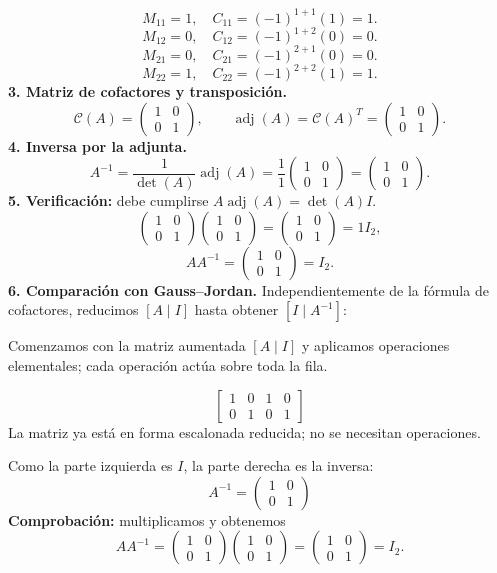 \documentclass[12pt]{article}
\theoremstyle{remark}
\newcommand{\adj}{\operatorname{adj}}
\begin{document}
\[
M_{11}=1,\quad C_{11}=(-1)^{1+1}(1)=1.
\]
\[
M_{12}=0,\quad C_{12}=(-1)^{1+2}(0)=0.
\]
\[
M_{21}=0,\quad C_{21}=(-1)^{2+1}(0)=0.
\]
\[
M_{22}=1,\quad C_{22}=(-1)^{2+2}(1)=1.
\]
\textbf{3. Matriz de cofactores y transposición.}
\[
\mathcal{C}(A)=\begin{pmatrix}1&0\\0&1\end{pmatrix},\qquad\adj(A)=\mathcal{C}(A)^T=\begin{pmatrix}1&0\\0&1\end{pmatrix}.
\]
\textbf{4. Inversa por la adjunta.}
\[
A^{-1}=\frac1{\det(A)}\adj(A)=\frac1{1}\begin{pmatrix}1&0\\0&1\end{pmatrix}=\begin{pmatrix}1&0\\0&1\end{pmatrix}.
\]
\textbf{5. Verificación:} debe cumplirse $A\adj(A)=\det(A)I$.
\[
\begin{pmatrix}1&0\\0&1\end{pmatrix}\begin{pmatrix}1&0\\0&1\end{pmatrix}=\begin{pmatrix}1&0\\0&1\end{pmatrix}=1I_{2},
\]
\[
AA^{-1}=\begin{pmatrix}1&0\\0&1\end{pmatrix}=I_{2}.
\]
\textbf{6. Comparación con Gauss--Jordan.} Independientemente de la fórmula de cofactores, reducimos $[A\mid I]$ hasta obtener $[I\mid A^{-1}]$:

Comenzamos con la matriz aumentada $[A\mid I]$ y aplicamos operaciones elementales; cada operación actúa sobre toda la fila.

\[
\left[\begin{array}{rr|rr}1&0&1&0\\0&1&0&1\end{array}\right]
\]
La matriz ya está en forma escalonada reducida; no se necesitan operaciones.

Como la parte izquierda es $I$, la parte derecha es la inversa:
\[
\boxed{A^{-1}=\begin{pmatrix}1&0\\0&1\end{pmatrix}}
\]
\textbf{Comprobación:} multiplicamos y obtenemos
\[
AA^{-1}=\begin{pmatrix}1&0\\0&1\end{pmatrix}\begin{pmatrix}1&0\\0&1\end{pmatrix}=\begin{pmatrix}1&0\\0&1\end{pmatrix}=I_{2}.
\]
\end{document}
